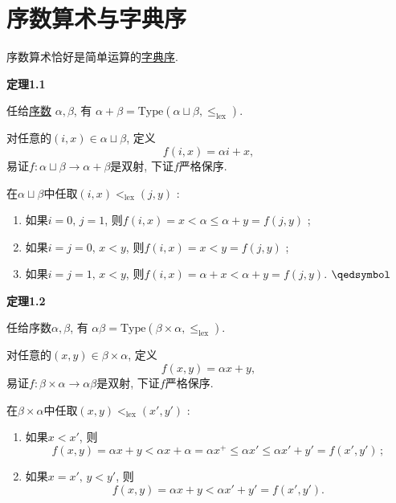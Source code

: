 \documentclass[UTF8]{ctexart}
\begin{document}
\setlength{\abovedisplayskip}{1pt}
\setlength{\belowdisplayskip}{1pt}

\section{序数算术与字典序}

序数算术恰好是简单运算的\href{../01 序关系/05 字典序#nameddest=sec:定义1.1}{字典序}.

\vspace{20pt}

\hypertarget{sec:定理1.1}{}
\noindent\textbf{定理1.1}

任给\href{../02 序数/01 序数#nameddest=sec:定义1.1}{序数} $\alpha,\beta$, 有
$\alpha+\beta=\mathrm{Type}(\alpha\sqcup\beta,\leqslant_{\mathrm{lex}})$.


对任意的$(i,x)\in \alpha\sqcup\beta$, 定义
\[
    f(i,x)=\alpha i+x,
\]
易证$f:\alpha\sqcup\beta\to\alpha+\beta$是双射, 下证$f$严格保序.

在$\alpha\sqcup\beta$中任取$(i,x)<_{\mathrm{lex}}(j,y)$ :
\begin{enumerate}
    \item 如果$i=0,\,j=1$, 则$f(i,x)=x<\alpha\leqslant\alpha+y=f(j,y)$ ;
    \item 如果$i=j=0,\,x<y$, 则$f(i,x)=x<y=f(j,y)$ ;
    \item 如果$i=j=1,\,x<y$, 则$f(i,x)=\alpha+x<\alpha+y=f(j,y)$.
    \hfill $\qedsymbol$
\end{enumerate}

\vspace{20pt}

\hypertarget{sec:定理1.2}{}
\noindent\textbf{定理1.2}

任给序数$\alpha,\beta$, 有
$\alpha\beta=\mathrm{Type}(\beta\times\alpha,\leqslant_{\mathrm{lex}})$.


对任意的$(x,y)\in\beta\times\alpha$, 定义
\[
    f(x,y)=\alpha x+y,
\]
易证$f:\beta\times\alpha\to\alpha\beta$是双射, 下证$f$严格保序.

在$\beta\times\alpha$中任取$(x,y)<_{\mathrm{lex}}(x',y')$ :
\begin{enumerate}
    \item 如果$x<x'$, 则
    \[
        f(x,y)=\alpha x+y<\alpha x+\alpha=\alpha x^+
        \leqslant\alpha x'\leqslant\alpha x'+y'=f(x',y')\,;
    \]
    \item 如果$x=x',\,y<y'$, 则
    \begin{equation*}
        f(x,y)=\alpha x+y<\alpha x'+y'=f(x',y').
    \tag*{\qedsymbol}\end{equation*}
\end{enumerate}
\end{document}
